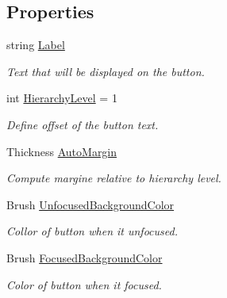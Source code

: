 \subsection*{Properties}
\begin{DoxyCompactItemize}
\item 
string \mbox{\hyperlink{class_wpf_handler_1_1_u_i_1_1_controls_1_1_catalog_button_ae34f49ccfd0f7a78d44a0a0beed99ed8}{Label}}
\begin{DoxyCompactList}\small\item\em Text that will be displayed on the button. \end{DoxyCompactList}\item 
int \mbox{\hyperlink{class_wpf_handler_1_1_u_i_1_1_controls_1_1_catalog_button_abf5864543b3338cad73968a464586543}{Hierarchy\+Level}} = 1
\begin{DoxyCompactList}\small\item\em Define offset of the button text. \end{DoxyCompactList}\item 
Thickness \mbox{\hyperlink{class_wpf_handler_1_1_u_i_1_1_controls_1_1_catalog_button_ab427b14cc2815b6d085f5c159cd0bb21}{Auto\+Margin}}
\begin{DoxyCompactList}\small\item\em Compute margine relative to hierarchy level. \end{DoxyCompactList}\item 
Brush \mbox{\hyperlink{class_wpf_handler_1_1_u_i_1_1_controls_1_1_catalog_button_a75b1005b0624dd175bc8403be01ad71f}{Unfocused\+Background\+Color}}
\begin{DoxyCompactList}\small\item\em Collor of button when it unfocused. \end{DoxyCompactList}\item 
Brush \mbox{\hyperlink{class_wpf_handler_1_1_u_i_1_1_controls_1_1_catalog_button_acd3112c31263741ec183d439e55242a6}{Focused\+Background\+Color}}
\begin{DoxyCompactList}\small\item\em Color of button when it focused. \end{DoxyCompactList}\item 

\end{DoxyCompactItemize}
